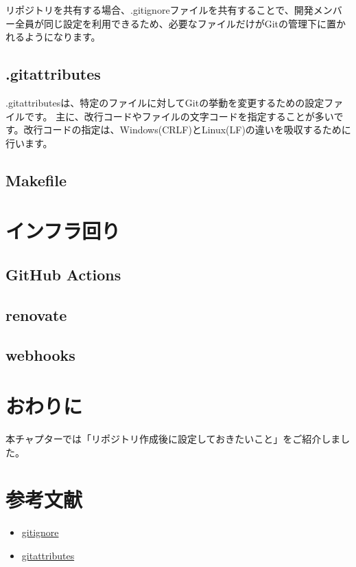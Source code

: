 リポジトリを共有する場合、.gitignoreファイルを共有することで、開発メンバー全員が同じ設定を利用できるため、必要なファイルだけがGitの管理下に置かれるようになります。

\subsection{.gitattributes}

.gitattributesは、特定のファイルに対してGitの挙動を変更するための設定ファイルです。
主に、改行コードやファイルの文字コードを指定することが多いです。改行コードの指定は、Windows(CRLF)とLinux(LF)の違いを吸収するために行います。


\subsection{Makefile}


\section{インフラ回り}

\subsection{GitHub Actions}
\subsection{renovate}
\subsection{webhooks}


\section{おわりに}
本チャプターでは「リポジトリ作成後に設定しておきたいこと」をご紹介しました。

\section{参考文献}
\begin{itemize}
  \item \href{https://git-scm.com/docs/gitignore}{gitignore}
  \item \href{https://git-scm.com/docs/gitattributes}{gitattributes}
\end{itemize}
